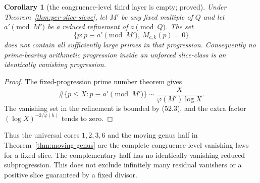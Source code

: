 \documentclass[10pt,reqno]{amsart}
\newtheorem{corollary}[theorem]{Corollary}
\theoremstyle{definition}
\newcommand{\1}{\mathbf 1}
\begin{document}
\begin{corollary}[the congruence-level third layer is empty; proved]
\label{cor:no-third-law}
Under Theorem~\ref{thm:per-slice-sieve}, let $M'$ be any fixed multiple of
$Q$ and let $a'\pmod {M'}$ be a reduced refinement of $a\pmod Q$.  The set
\begin{equation}\tag{52.16}
                  \{p:p\equiv a'\pmod {M'},\ M_{c,k}(p)=0\}
\end{equation}
does not contain all sufficiently large primes in that progression.
Consequently no prime-bearing arithmetic progression inside an unforced
slice-class is an identically vanishing progression.
\end{corollary}
\begin{proof}
The fixed-progression prime number theorem gives
\begin{equation}\tag{52.17}
 \#\{p\leq X:p\equiv a'\pmod {M'}\}
 \sim\frac X{\varphi(M')\log X}.
\end{equation}
The vanishing set in the refinement is bounded by (52.3), and the extra
factor $(\log X)^{-2/\varphi(h)}$ tends to zero.
\end{proof}
Thus the universal cores $1,2,3,6$ and the moving genus half in
Theorem~\ref{thm:moving-genus} are the complete congruence-level vanishing
laws for a fixed slice.  The complementary half has no identically
vanishing reduced subprogression.  This does not exclude infinitely many
residual vanishers or a positive slice guaranteed by a fixed divisor.
\end{document}
